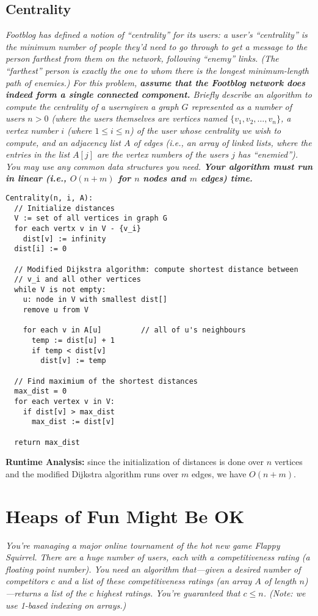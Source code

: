 \documentclass[11pt, oneside]{article}   	%
\theoremstyle{definition}
\theoremstyle{remark}
\begin{document}
\subsection{Centrality}
\textit{Footblog has defined a notion of ``centrality'' for its users: a user's ``centrality'' is the minimum number of people they'd need to go through to get a message to the person farthest from them on the network, following ``enemy'' links. (The ``farthest'' person is exactly the one to whom there is the longest minimum-length path of enemies.) For this problem, \textbf{assume that the Footblog network does indeed form a single connected component.} Briefly describe an algorithm to compute the centrality of a userngiven a graph $G$ represented as a number of users $n > 0$ (where the users themselves are vertices named $\{v_1, v_2, \ldots, v_n\}$, a vertex number $i$ (where $1 \leq i \leq n$) of the user whose centrality we wish to compute, and an adjacency list $A$ of edges (i.e., an array of linked lists, where the entries in the list $A[j]$ are the vertex numbers of the users $j$ has ``enemied''). You may use any common data structures you need. \textbf{Your algorithm must run in linear (i.e., $O(n + m)$ for $n$ nodes and $m$ edges) time.}}
\begin{verbatim}
Centrality(n, i, A):
  // Initialize distances
  V := set of all vertices in graph G
  for each vertx v in V - {v_i}
    dist[v] := infinity
  dist[i] := 0
  
  // Modified Dijkstra algorithm: compute shortest distance between
  // v_i and all other vertices
  while V is not empty:
    u: node in V with smallest dist[]
    remove u from V
    
    for each v in A[u]		   // all of u's neighbours
      temp := dist[u] + 1
      if temp < dist[v]
        dist[v] := temp
  
  // Find maximium of the shortest distances
  max_dist = 0
  for each vertex v in V:
    if dist[v] > max_dist
      max_dist := dist[v]
    
  return max_dist
\end{verbatim}
\textbf{Runtime Analysis:} since the initialization of distances is done over $n$ vertices and the modified Dijkstra algorithm runs over $m$ edges, we have $O(n+m)$.


\cleardoublepage
\section{Heaps of Fun Might Be OK}
\textit{You're managing a major online tournament of the hot new game Flappy
Squirrel. There are a huge number of users, each with a
competitiveness rating (a floating point number). You need an
algorithm that---given a desired number of competitors $c$ and a list
of these competitiveness ratings (an array $A$ of length
$n$)---returns a list of the $c$ highest ratings. You're guaranteed
that $c \leq n$. (Note: we use 1-based indexing on arrays.)}
\end{document}
